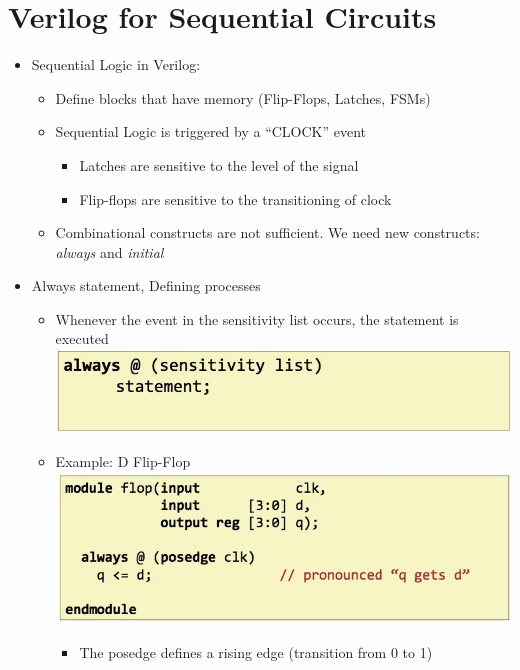\documentclass[a4paper]{article}
\begin{document}
\section{Verilog for Sequential Circuits}
\begin{itemize}
\item Sequential Logic in Verilog:
\begin{itemize}
\item Define blocks that have memory (Flip-Flops, Latches, FSMs)
\item Sequential Logic is triggered by a ``CLOCK'' event
\begin{itemize}
\item Latches are sensitive to the level of the signal
\item Flip-flops are sensitive to the transitioning of clock
\end{itemize}
\item Combinational constructs are not sufficient. We need new constructs: \emph{always} and \emph{initial}
\end{itemize}
\item Always statement, Defining processes
\begin{itemize}
\item Whenever the event in the sensitivity list occurs, the statement is executed\\
\includegraphics[scale=0.4]{Figures/alwaysStatementDefiningProcesses.jpg}
\item Example: D Flip-Flop\\\includegraphics[scale=0.4]{Figures/exampleDFlipFlop.jpg}
\begin{itemize}
\item The posedge defines a rising edge (transition from 0 to 1)

\end{itemize}
\end{itemize}
\end{itemize}
\end{document}
